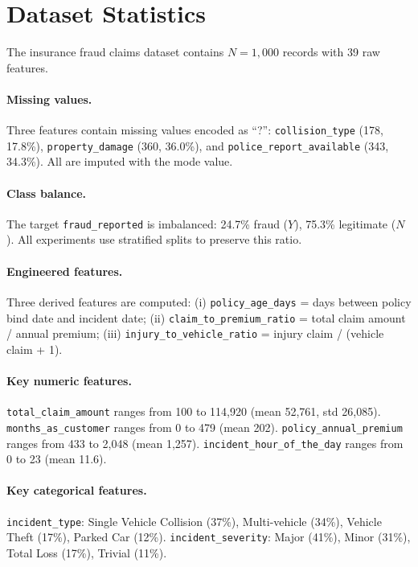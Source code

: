 \section{Dataset Statistics}
\label{app:data}

The insurance fraud claims dataset contains $N = 1{,}000$ records with 39 raw features.

\paragraph{Missing values.} Three features contain missing values encoded as ``?'': \texttt{collision\_type} (178, 17.8\%), \texttt{property\_damage} (360, 36.0\%), and \texttt{police\_report\_available} (343, 34.3\%). All are imputed with the mode value.

\paragraph{Class balance.} The target \texttt{fraud\_reported} is imbalanced: 24.7\% fraud ($Y$), 75.3\% legitimate ($N$). All experiments use stratified splits to preserve this ratio.

\paragraph{Engineered features.} Three derived features are computed: (i) \texttt{policy\_age\_days} = days between policy bind date and incident date; (ii) \texttt{claim\_to\_premium\_ratio} = total claim amount / annual premium; (iii) \texttt{injury\_to\_vehicle\_ratio} = injury claim / (vehicle claim + 1).

\paragraph{Key numeric features.} \texttt{total\_claim\_amount} ranges from 100 to 114{,}920 (mean 52{,}761, std 26{,}085). \texttt{months\_as\_customer} ranges from 0 to 479 (mean 202). \texttt{policy\_annual\_premium} ranges from 433 to 2{,}048 (mean 1{,}257). \texttt{incident\_hour\_of\_the\_day} ranges from 0 to 23 (mean 11.6).

\paragraph{Key categorical features.} \texttt{incident\_type}: Single Vehicle Collision (37\%), Multi-vehicle (34\%), Vehicle Theft (17\%), Parked Car (12\%). \texttt{incident\_severity}: Major (41\%), Minor (31\%), Total Loss (17\%), Trivial (11\%).
